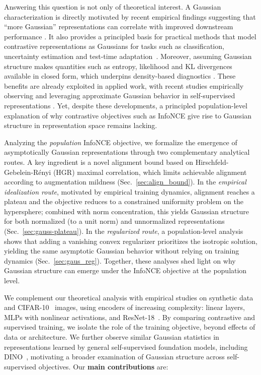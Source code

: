 \documentclass{article}
\begin{document}
Answering this question is not only of theoretical interest.
A Gaussian characterization is directly motivated by recent empirical findings suggesting that ``more Gaussian'' representations can correlate with improved downstream performance \citep{eftekhari2025importance}.
It also provides a principled basis for practical methods that model contrastive representations as Gaussians for tasks such as classification, uncertainty estimation and test-time adaptation~\citep{baumann2024post,morales2024bayesadapter}.
Moreover, assuming Gaussian structure makes quantities such as entropy, likelihood and KL divergences available in closed form, which underpins density-based diagnostics \citep{lee2018simple,betser2025whitened}.
These benefits are already exploited in applied work, with recent studies empirically observing and leveraging approximate Gaussian behavior in self-supervised representations \citep{baumann2024post,balestriero2025gaussian,betser2025general}.
Yet, despite these developments, a principled population-level explanation of why contrastive objectives such as InfoNCE give rise to Gaussian structure in representation space remains lacking.

Analyzing the \emph{population} InfoNCE objective, we formalize the emergence of asymptotically Gaussian representations through two complementary analytical routes.
A key ingredient is a novel alignment bound based on Hirschfeld-Gebelein-Rényi (HGR) maximal correlation, which limits achievable alignment according to augmentation mildness (Sec.~\ref{sec:align_bound}).
In the \emph{empirical idealization route}, motivated by empirical training dynamics, alignment reaches a plateau and the objective reduces to a constrained uniformity problem on the hypersphere; combined with norm concentration, this yields Gaussian structure for both normalized (to a unit norm) and unnormalized representations (Sec.~\ref{sec:gauss-plateau}).
In the \emph{regularized route}, a population-level analysis shows that adding a vanishing convex regularizer prioritizes the isotropic solution, yielding the same asymptotic Gaussian behavior without relying on training dynamics (Sec.~\ref{sec:gaus_reg}).
Together, these analyses shed light on why Gaussian structure can emerge under the InfoNCE objective at the population level.

We complement our theoretical analysis with empirical studies on synthetic data and CIFAR-10~\citep{krizhevsky2009learning} images, using encoders of increasing complexity: linear layers, MLPs with nonlinear activations, and ResNet-18~\citep{he2016deep}.
By comparing contrastive and supervised training, we isolate the role of the training objective, beyond effects of data or architecture.
We further observe similar Gaussian statistics in representations learned by general self-supervised foundation models, including DINO~\citep{caron2021emerging}, motivating a broader examination of Gaussian structure across self-supervised objectives.
Our \textbf{main contributions} are:
\end{document}
